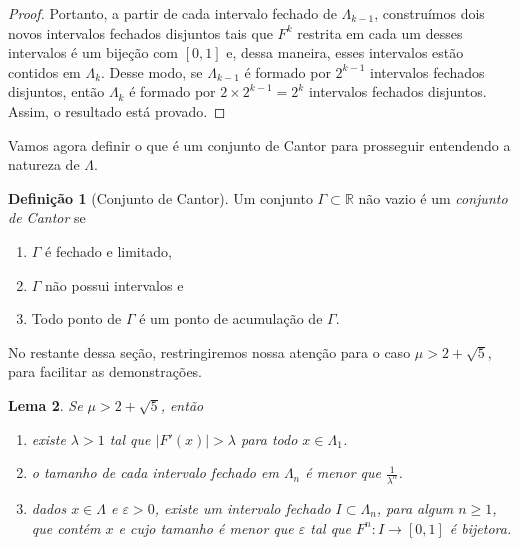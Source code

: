 \documentclass[a4paper, 12pt]{article}
\theoremstyle{definition}
\newtheorem{definition}{Definição}[section]
\theoremstyle{plain}
\theoremstyle{plain}
\newtheorem{lemma}[definition]{Lema}
\theoremstyle{plain}
\theoremstyle{definition}
\theoremstyle{remark}
\newcommand{\RR}{\mathbb{R}}
\begin{document}
\begin{proof}
Portanto, a partir de cada intervalo fechado de $\Lambda_{k-1}$, construímos dois novos intervalos fechados disjuntos tais que $F^k$ restrita em cada um desses intervalos é um bijeção com $[0, 1]$ e, dessa maneira, esses intervalos estão contidos em $\Lambda_k$. Desse modo, se $\Lambda_{k-1}$ é formado por $2^{k-1}$ intervalos fechados disjuntos, então $\Lambda_k$ é formado por $2 \times 2^{k-1} = 2^k$ intervalos fechados disjuntos. Assim, o resultado está provado.
\end{proof}

Vamos agora definir o que é um conjunto de Cantor para prosseguir entendendo a natureza de $\Lambda$.

\begin{definition}[Conjunto de Cantor]
Um conjunto $\Gamma \subset \RR$ não vazio é um \textit{conjunto de Cantor} se
\begin{enumerate}
\item $\Gamma$ é fechado e limitado,
\item $\Gamma$ não possui intervalos e
\item Todo ponto de $\Gamma$ é um ponto de acumulação de $\Gamma$.
\end{enumerate}
\end{definition}

No restante dessa seção, restringiremos nossa atenção para o caso $\mu > 2 + \sqrt{5}$, para facilitar as demonstrações.

\begin{lemma}
\label{lemma 4 1}
Se $\mu > 2 + \sqrt{5}$, então
\begin{enumerate}
\item  existe $\lambda > 1$ tal que $|F'(x)| > \lambda$ para todo $x \in \Lambda_1$.
\item o tamanho de cada intervalo fechado em $\Lambda_n$ é menor que $\frac{1}{\lambda^n}$.
\item dados $x \in \Lambda$ e $\varepsilon > 0$, existe um intervalo fechado $I \subset \Lambda_n$, para algum $n \geq 1$,  que contém $x$ e cujo tamanho é menor que $\varepsilon$ tal que $F^n: I \to [0,1]$ é bijetora.
\end{enumerate}
\end{lemma}
\end{document}
